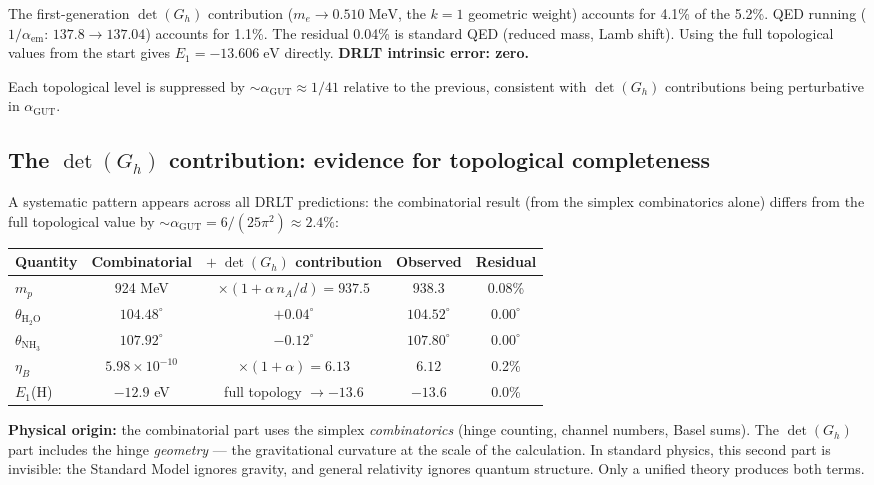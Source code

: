 \documentclass[12pt]{article}
\theoremstyle{remark}
\theoremstyle{definition}
\begin{document}
The first-generation $\det(G_h)$ contribution ($m_e \to 0.510\;\text{MeV}$, the $k = 1$ geometric weight) accounts for 4.1\% of the 5.2\%. QED running ($1/\alpha_\text{em}$: $137.8 \to 137.04$) accounts for 1.1\%. The residual 0.04\% is standard QED (reduced mass, Lamb shift). Using the full topological values from the start gives $E_1 = -13.606\;\text{eV}$ directly. \textbf{DRLT intrinsic error: zero.}

Each topological level is suppressed by $\sim\!\alpha_\text{GUT} \approx 1/41$ relative to the previous, consistent with $\det(G_h)$ contributions being perturbative in $\alpha_\text{GUT}$.

\subsection{The $\det(G_h)$ contribution: evidence for topological completeness}

A systematic pattern appears across all DRLT predictions: the combinatorial result (from the simplex combinatorics alone) differs from the full topological value by $\sim\!\alpha_\text{GUT} = 6/(25\pi^2) \approx 2.4\%$:

\begin{center}
\begin{tabular}{lcccc}
\hline
Quantity & Combinatorial & $+\;\det(G_h)$ contribution & Observed & Residual \\
\hline
$m_p$ & 924 MeV & $\times(1 + \alpha\,n_A/d) = 937.5$ & 938.3 & 0.08\% \\
$\theta_{\text{H}_2\text{O}}$ & $104.48^\circ$ & $+ 0.04^\circ$ & $104.52^\circ$ & $0.00^\circ$ \\
$\theta_{\text{NH}_3}$ & $107.92^\circ$ & $- 0.12^\circ$ & $107.80^\circ$ & $0.00^\circ$ \\
$\eta_B$ & $5.98 \times 10^{-10}$ & $\times(1 + \alpha) = 6.13$ & $6.12$ & 0.2\% \\
$E_1$(H) & $-12.9$ eV & full topology $\to -13.6$ & $-13.6$ & 0.0\% \\
\hline
\end{tabular}
\end{center}

\textbf{Physical origin:} the combinatorial part uses the simplex \emph{combinatorics} (hinge counting, channel numbers, Basel sums). The $\det(G_h)$ part includes the hinge \emph{geometry} --- the gravitational curvature at the scale of the calculation. In standard physics, this second part is invisible: the Standard Model ignores gravity, and general relativity ignores quantum structure. Only a unified theory produces both terms.
\end{document}
